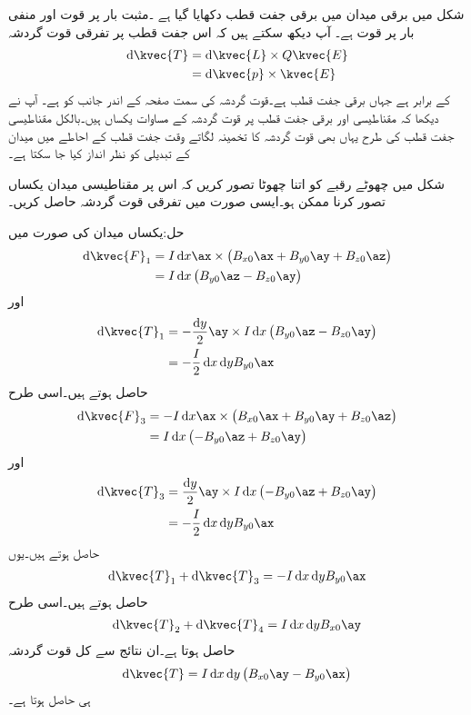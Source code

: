 شکل  میں برقی میدان میں برقی جفت قطب دکھایا گیا ہے ۔مثبت بار پر قوت  اور منفی بار پر قوت    ہے۔ آپ دیکھ سکتے ہیں کہ اس جفت قطب پر  تفرقی قوت گردشہ
\begin{align*}
\dif \kvec{T}&=\dif \kvec{L} \times Q \kvec{E}\\
&=\dif \kvec{p} \times \kvec{E}
\end{align*}
کے برابر ہے جہاں  برقی جفت قطب ہے۔قوت گردشہ کی سمت صفحہ کے اندر جانب کو ہے۔ آپ نے دیکھا کہ مقناطیسی اور برقی جفت قطب پر قوت گردشہ کے مساوات یکساں ہیں۔بالکل مقناطیسی جفت قطب کی طرح یہاں بھی قوت گردشہ کا تخمینہ لگاتے وقت جفت قطب کے احاطے میں میدان  کے تبدیلی کو نظر انداز کیا جا سکتا ہے۔

شکل  میں چھوٹے رقبے کو اتنا چھوٹا تصور کریں کہ اس پر مقناطیسی میدان یکساں تصور کرنا ممکن ہو۔ایسی صورت میں تفرقی قوت گردشہ حاصل کریں۔

حل:یکساں میدان کی صورت میں
\begin{align*}
\dif \kvec{F}_1&=I \dif x \ax \times \left(B_{x0} \ax+B_{y0}\ay+B_{z0}\az\right)\\
&=I \dif x \left(B_{y0}\az-B_{z0}\ay \right)
\end{align*}
اور
\begin{align*}
\dif \kvec{T}_1&=-\frac{\dif y}{2}\ay \times I \dif x \left(B_{y0}\az-B_{z0}\ay \right)\\
&=-\frac{I}{2} \dif x \dif y B_{y0}\ax
\end{align*}
حاصل ہوتے ہیں۔اسی طرح
\begin{align*}
\dif \kvec{F}_3&=-I \dif x \ax \times \left(B_{x0} \ax+B_{y0}\ay+B_{z0}\az\right)\\
&=I \dif x \left(-B_{y0}\az+B_{z0}\ay \right)
\end{align*}
اور
\begin{align*}
\dif \kvec{T}_3&=\frac{\dif y}{2}\ay \times I \dif x \left(-B_{y0}\az+B_{z0}\ay \right)\\
&=-\frac{I}{2} \dif x \dif y B_{y0}\ax
\end{align*}
حاصل ہوتے ہیں۔یوں
\begin{align*}
\dif \kvec{T}_1+\dif \kvec{T}_3=-I \dif x \dif y B_{y0}\ax
\end{align*}
حاصل ہوتے ہیں۔اسی طرح
\begin{align*}
\dif \kvec{T}_2+\dif \kvec{T}_4=I\dif x \dif y  B_{x0}\ay
\end{align*}
حاصل ہوتا ہے۔ان نتائج سے کل قوت گردشہ
\begin{align*}
\dif \kvec{T}=I \dif x \dif y  \left(B_{x0}\ay -B_{y0}\ax\right) 
\end{align*}
ہی حاصل ہوتا ہے۔

